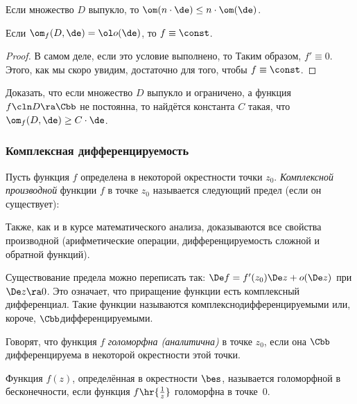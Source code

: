 \documentclass[a4paper]{article}
\begin{document}
\begin{imp}
Если множество $D$ выпукло, то $\om(n\cdot \de) \le n\cdot \om(\de)$.
\end{imp}

\begin{imp}
Если $\om_f(D,\de) = \ol o(\de)$, то $f\equiv \const$.
\end{imp}
\begin{proof}
В самом деле, если это условие выполнено, то
Таким образом, $f' \equiv 0$. Этого, как мы скоро увидим, достаточно для того,
чтобы $f \equiv \const$.
\end{proof}

\begin{problem}
Доказать, что если множество $D$ выпукло и ограничено, а функция $f\cln D\ra\Cbb$ не постоянна, то найдётся
константа $C$ такая, что $\om_f(D,\de) \ge C\cdot \de$.
\end{problem}

\subsubsection{Комплексная дифференцируемость}

\begin{df}
Пусть функция $f$ определена в некоторой окрестности точки $z_0$.
\emph{Комплексной производной} функции $f$ в точке $z_0$ называется следующий предел (если он существует):
\end{df}

Также, как и в курсе математического анализа, доказываются все свойства производной (арифметические операции,
дифференцируемость сложной и обратной функций).

Существование предела можно переписать так: $\De f = f'(z_0 )\De z + o(\De z)$ при $\De z \ra 0$. Это означает, что
приращение функции есть комплексный дифференциал. Такие функции называются комплексно\д дифференцируемыми или, короче,
$\Cbb$\д дифференцируемыми.

\begin{df}
Говорят, что функция $f$ \emph{голоморфна (аналитична)} в точке $z_0$, если она $\Cbb$\д дифференцируема
в некоторой окрестности этой точки.
\end{df}

\begin{df}
Функция $f(z)$, определённая в окрестности $\bes$, называется голоморфной в бесконечности, если функция
$f\hr{\frac1z}$ голоморфна в точке~$0$.
\end{df}
\end{document}
